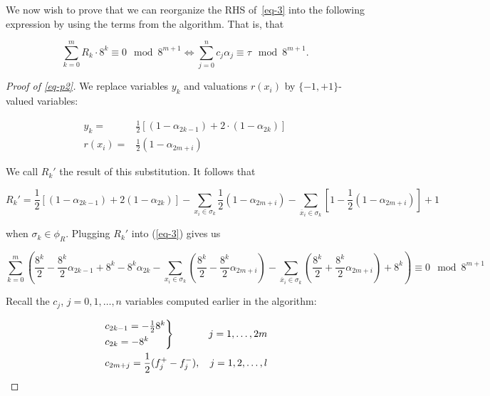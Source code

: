 \documentclass{amsart}
\newcommand{\ov}{\overline}
\theoremstyle{plain}
\begin{document}
We now wish to prove that we can reorganize the RHS of~\autoref{eq-3} into the following expression
by using the terms from the algorithm. That is, that

\begin{equation}\label{eq-p2}
 \sum_{k=0}^m R_k\cdot 8^k\equiv 0\mod 8^{m+1}\iff\sum_{j=0}^n c_j\alpha_j\equiv\tau\mod 8^{m+1}.
\end{equation}

\begin{proof}[Proof of \autoref{eq-p2}]

We replace variables $y_k$ and valuations $r(x_i)$ by $\{-1,+1\}$-valued variables:

\begin{align*}
  y_k=&\frac{1}{2}\left[\left(1-\alpha_{2k-1}\right)+2\cdot\left(1-\alpha_{2k}\right)\right]\\
  r(x_i)=&\frac{1}{2}\left(1-\alpha_{2m+i}\right)
\end{align*}

We call $R_k'$ the result of this substitution. It follows that

\begin{equation*}
  R_k'=\frac{1}{2}[(1-\alpha_{2k-1})+2(1-\alpha_{2k})]-\sum_{x_i\in\sigma_k}\frac{1}{2}(1-
  \alpha_{2m+i})-\sum_{\ov{x}_i\in\sigma_k}\left[1-\frac{1}{2}(1-\alpha_{2m+i})\right]+1
\end{equation*}

when $\sigma_k\in\phi_R$. Plugging $R_k'$ into (\ref{eq-3}) gives us

\begin{equation}\label{eq-4}
  \sum_{k=0}^m\left(\frac{8^k}{2}-\frac{8^k}{2}\alpha_{2k-1}+8^k-8^k\alpha_{2k}-
  \sum_{x_i\in\sigma_k}\left(\frac{8^k}{2}-\frac{8^k}{2}\alpha_{2m+i}\right)-
  \sum_{\ov{x}_i\in\sigma_k}\left(\frac{8^k}{2}+\frac{8^k}{2}\alpha_{2m+i}\right)+8^k\right)\equiv
  0\mod 8^{m+1}
\end{equation}

Recall the $c_j$, $j=0,1,\ldots,n$ variables computed earlier in the algorithm:

\begin{align*}
  &\begin{rcases*}
    c_{2k-1}=-\frac{1}{2}8^k\\
    c_{2k}=-8^k\\
  \end{rcases*} &j=1,\ldots,2m\\
  &\;c_{2m+j}=\frac{1}{2}(f_j^+-f_j^-), &j=1,2,\ldots,l
\end{align*}


\end{proof}
\end{document}

